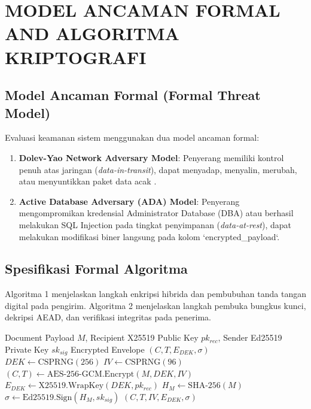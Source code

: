 \documentclass[conference]{IEEEtran}
\begin{document}
\section{MODEL ANCAMAN FORMAL AND ALGORITMA KRIPTOGRAFI}

\subsection{Model Ancaman Formal (Formal Threat Model)}
Evaluasi keamanan sistem menggunakan dua model ancaman formal:
\begin{enumerate}
    \item \textbf{Dolev-Yao Network Adversary Model}: Penyerang memiliki kontrol penuh atas jaringan (\textit{data-in-transit}), dapat menyadap, menyalin, merubah, atau menyuntikkan paket data acak \cite{dolev1983security}.
    \item \textbf{Active Database Adversary (ADA) Model}: Penyerang mengompromikan kredensial Administrator Database (DBA) atau berhasil melakukan SQL Injection pada tingkat penyimpanan (\textit{data-at-rest}), dapat melakukan modifikasi biner langsung pada kolom `encrypted_payload`.
\end{enumerate}

\subsection{Spesifikasi Formal Algoritma}

Algoritma 1 menjelaskan langkah enkripsi hibrida dan pembubuhan tanda tangan digital pada pengirim. Algoritma 2 menjelaskan langkah pembuka bungkus kunci, dekripsi AEAD, dan verifikasi integritas pada penerima.

\begin{algorithm}[htbp]
\caption{Hybrid Document Encryption, Key Wrapping, and Ed25519 Signing}
\label{alg:encrypt}
\begin{algorithmic}[1]
\REQUIRE Document Payload $M$, Recipient X25519 Public Key $pk_{rec}$, Sender Ed25519 Private Key $sk_{sig}$
\ENSURE Encrypted Envelope $(C, T, E_{DEK}, \sigma)$
\STATE $DEK \leftarrow \text{CSPRNG}(256)$ 
\STATE $IV \leftarrow \text{CSPRNG}(96)$ 
\STATE $(C, T) \leftarrow \text{AES-256-GCM.Encrypt}(M, DEK, IV)$
\STATE $E_{DEK} \leftarrow \text{X25519.WrapKey}(DEK, pk_{rec})$
\STATE $H_M \leftarrow \text{SHA-256}(M)$
\STATE $\sigma \leftarrow \text{Ed25519.Sign}(H_M, sk_{sig})$
\RETURN $(C, T, IV, E_{DEK}, \sigma)$
\end{algorithmic}
\end{algorithm}
\end{document}
